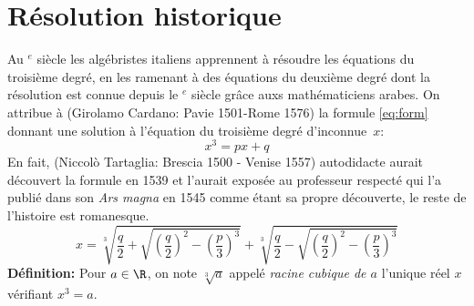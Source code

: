 \documentclass[a4paper]{article}
\begin{document}

\section{R\'esolution historique}
Au $^e$ si\`ecle les alg\'ebristes italiens apprennent
\`a r\'esoudre les \'equations du troisi\`eme degr\'e, en les ramenant
\`a des \'equations du deuxi\`eme degr\'e dont la r\'esolution est
connue depuis le $^e$ si\`ecle gr\^ace auxs math\'ematiciens arabes.
On attribue \`a  (Girolamo Cardano: Pavie 1501-Rome 1576) la
formule \eqref{eq:form} donnant une solution \`a l'\'equation du troisi\`eme
degr\'e d'inconnue~$x$:
\begin{equation}
  \label{eq:deg3}
  x^3=px+q
\end{equation}
En fait,  (Niccol\`o Tartaglia:
Brescia 1500 - Venise 1557)  autodidacte aurait d\'ecouvert la formule
en 1539 et l'aurait expos\'ee au professeur respect\'e 
qui l'a publi\'e dans son \emph{Ars magna} en
1545 comme \'etant sa propre d\'ecouverte, le reste de l'histoire est
romanesque.
\begin{equation}
  \label{eq:form}
  x=\sqrt[3]{\frac{q}{2}+\sqrt{\left(\frac{q}{2}\right)^2-\left(\frac{p}{3}\right)^3}}+\sqrt[3]{\frac{q}{2}-\sqrt{\left(\frac{q}{2}\right)^2-\left(\frac{p}{3}\right)^3}}
\end{equation}
\textbf{D\'efinition:} Pour $a\in\R$, on note $\sqrt[3]{a}$ appel\'e \emph{racine
    cubique de $a$} l'unique r\'eel $x$ v\'erifiant $x^3=a$.
\end{document}
